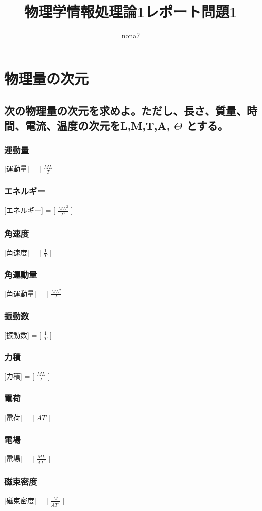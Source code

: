 \documentclass[12pt,a4]{article}
\title{物理学情報処理論1レポート問題1}
\author{nona7}
\date{}
\begin{document}
\maketitle

\section{物理量の次元}
\subsection{次の物理量の次元を求めよ。ただし、長さ、質量、時間、電流、温度の次元をL,M,T,A, $\Theta$ とする。}
\subsubsection{運動量}
[運動量] = [ $ \frac{ML}{T} $ ]
\subsubsection{エネルギー}
[エネルギー] = [ $ \frac{ML^2}{T^2} $ ]
\subsubsection{角速度}
[角速度] = [ $ \frac{1}{T} $ ]
\subsubsection{角運動量}
[角運動量] = [ $ \frac{ML^2}{T} $ ]
\subsubsection{振動数}
[振動数] = [ $ \frac{1}{T} $ ]
\subsubsection{力積}
[力積] = [ $ \frac{ML}{T} $ ]
\subsubsection{電荷}
[電荷] = [ $ AT $ ]
\subsubsection{電場}
[電場] = [ $ \frac{ML}{AT^3} $ ]
\subsubsection{磁束密度}
[磁束密度] = [ $ \frac{M}{AT^2} $ ]
\end{document}

